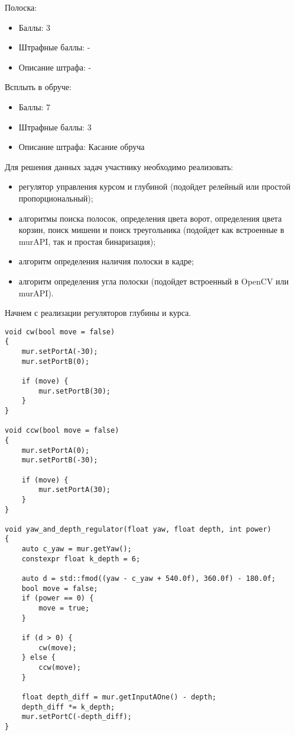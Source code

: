 Полоска:
\begin{itemize}
    \item Баллы: 3
    \item Штрафные баллы: -
    \item Описание штрафа: -
\end{itemize}

Всплыть в обруче:
\begin{itemize}
    \item Баллы: 7
    \item Штрафные баллы: 3
    \item Описание штрафа: Касание обруча
\end{itemize}

\solutionSection

Для решения данных задач участнику необходимо реализовать:

\begin{itemize}
    \item регулятор управления курсом и глубиной (подойдет релейный или простой пропорциональный);
    \item алгоритмы поиска полосок, определения цвета ворот, определения цвета корзин, поиск мишени и поиск треугольника (подойдет как встроенные в murAPI, так и простая бинаризация);
    \item алгоритм определения наличия полоски в кадре;
    \item алгоритм определения угла полоски (подойдет встроенный в OpenCV или murAPI).
\end{itemize}

Начнем с реализации регуляторов глубины и курса. 

\begin{verbatim}
void cw(bool move = false)
{
    mur.setPortA(-30);
    mur.setPortB(0);

    if (move) {
        mur.setPortB(30);
    }
}

void ccw(bool move = false)
{
    mur.setPortA(0);
    mur.setPortB(-30);

    if (move) {
        mur.setPortA(30);
    }
}

void yaw_and_depth_regulator(float yaw, float depth, int power)
{
    auto c_yaw = mur.getYaw();
    constexpr float k_depth = 6;

    auto d = std::fmod((yaw - c_yaw + 540.0f), 360.0f) - 180.0f;
    bool move = false;
    if (power == 0) {
        move = true;
    }

    if (d > 0) {
        cw(move);
    } else {
        ccw(move);
    }

    float depth_diff = mur.getInputAOne() - depth;
    depth_diff *= k_depth;
    mur.setPortC(-depth_diff);
}
\end{verbatim}


